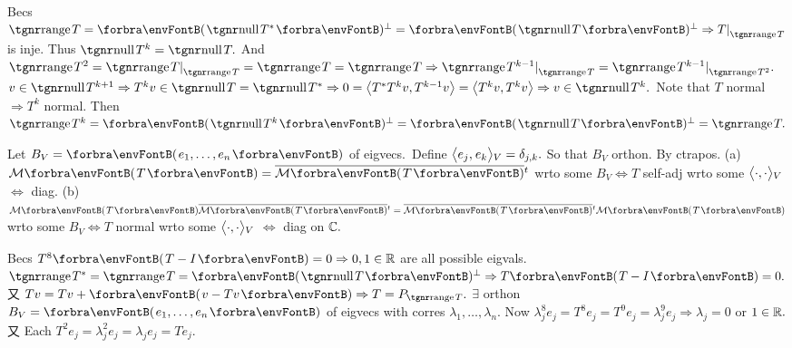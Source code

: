 Becs $\range T=\Par{\null T^*}{^\perp}=\Par{\null T}{^\perp}\Rightarrow T\mmid_{\range T}$ is inje. Thus $\null T^k=\null T.$\parSol{}
And $\range T^2=\range T\mmid_{\range T}=\range T=\range T\Rightarrow\range T^{k-1}\mmid_{\range T}=\range T^{k-1}\mmid_{\range T^2}.$\PfEnd\vspace{4pt}\parSol{}
\Or $v\in\null T^{k+1}\Rightarrow T^kv\in\null T=\null T^*\Rightarrow0=\Ang{T^*T^kv,T^{k-1}v}=\Ang{T^kv,T^kv}\Rightarrow v\in\null T^k.$\parSol{}
Note that $T$ normal $\Rightarrow T^k$ normal. Then $\range T^k=\Par{\null T^k}{^\perp}=\Par{\null T}{^\perp}=\range T.$\PfEnd
\SepLine

\ChEnd
\pagebreak


\vspace{4pt}

Let $B_V=\Par{e_1,\dots,e_n}$ of eigvecs. \,Define $\big\langle{}e_j,\:\!e_k{}\big\rangle{_V}=\delta_{j,k}.$ \;So that $B_V$ orthon. \;\Or By ctrapos.\PfEnd\vspace{5pt}
\ANote (a) $\Mt{T}=\overline{\Mt{T}}{^t}$ wrto some $B_V\Longleftrightarrow T$ self-adj wrto some $\big\langle{}\cdot,\cdot{}\big\rangle{_V}$ $\Longleftrightarrow$ diag.\parNot
(b) $\Mt{T}\overline{\Mt{T}}{^t}=\overline{\Mt{T}}{^t}\Mt{T}$ wrto some $B_V\Longleftrightarrow T$ normal wrto some $\big\langle{}\cdot,\cdot{}\big\rangle{_V}$ $\Longleftrightarrow$ diag on ${\mathbb{C}}.$
\SepLine

Becs $T^8\Par{T-I}=0\Rightarrow0,1\in\Rbb$ are all possible eigvals.\PfEnd\parSol{}
\Or $\range T^*=\range T=\Par{\null T}{^\perp}\Rightarrow T\Par{T-I}=0.$ 又 $Tv=Tv+\Par{v-Tv}\Rightarrow T=P_{\range T}.$\PfEnd\parSol{}
\Or $\exists$ orthon $B_V=\Par{e_1,\dots,e_n}$ of eigvecs with corres $\lambda_1,\dots,\lambda_n.$\parSol{}
Now $\lambda_j^8e_j=T^8e_j=T^9e_j=\lambda_j^9e_j\Rightarrow\lambda_j=0$ or $1\in{\mathbb{R}}.$ 又 Each $T^2e_j=\lambda_j^2e_j=\lambda_je_j=Te_j.$\PfEnd
\SepLine

\SepLine

\SepLine

\SepLine

\SepLine
\ChEnd